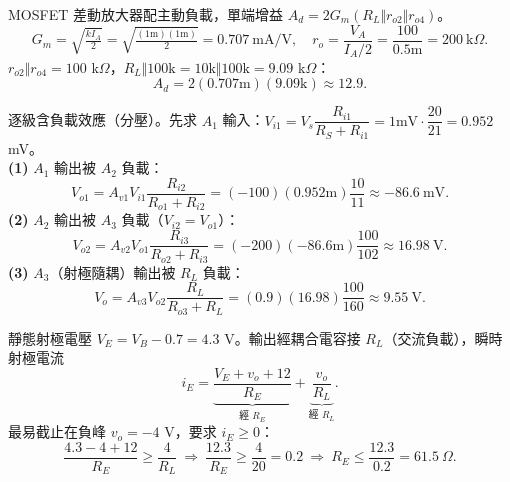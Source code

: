\documentclass[12pt]{article}
\begin{document}
\sol MOSFET 差動放大器配主動負載，單端增益 $A_d=2G_m(R_L\Vert r_{o2}\Vert r_{o4})$。
\[ G_m=\sqrt{\tfrac{kI_A}{2}}=\sqrt{\tfrac{(1\text{m})(1\text{m})}{2}}=0.707\ \text{mA/V},\quad
   r_o=\frac{V_A}{I_A/2}=\frac{100}{0.5\text{m}}=200\ \text{k}\Omega. \]
$r_{o2}\Vert r_{o4}=100$ k$\Omega$，$R_L\Vert100\text{k}=10\text{k}\Vert100\text{k}=9.09$ k$\Omega$：
\[ A_d=2(0.707\text{m})(9.09\text{k})\approx12.9. \]

\begin{minipage}{0.60\linewidth}
\end{minipage}\hfill
\begin{minipage}{0.37\linewidth}
\end{minipage}

\sol 逐級含負載效應（分壓）。先求 $A_1$ 輸入：$V_{i1}=V_s\dfrac{R_{i1}}{R_S+R_{i1}}=1\text{mV}\cdot\dfrac{20}{21}=0.952$ mV。\\
\textbf{(1)} $A_1$ 輸出被 $A_2$ 負載：
\[ V_{o1}=A_{v1}V_{i1}\frac{R_{i2}}{R_{o1}+R_{i2}}=(-100)(0.952\text{m})\frac{10}{11}\approx-86.6\ \text{mV}. \]
\textbf{(2)} $A_2$ 輸出被 $A_3$ 負載（$V_{i2}=V_{o1}$）：
\[ V_{o2}=A_{v2}V_{o1}\frac{R_{i3}}{R_{o2}+R_{i3}}=(-200)(-86.6\text{m})\frac{100}{102}\approx16.98\ \text{V}. \]
\textbf{(3)} $A_3$（射極隨耦）輸出被 $R_L$ 負載：
\[ V_o=A_{v3}V_{o2}\frac{R_L}{R_{o3}+R_L}=(0.9)(16.98)\frac{100}{160}\approx9.55\ \text{V}. \]

\begin{minipage}{0.60\linewidth}
\end{minipage}\hfill
\begin{minipage}{0.37\linewidth}
\end{minipage}

\sol 靜態射極電壓 $V_E=V_B-0.7=4.3$ V。輸出經耦合電容接 $R_L$（交流負載），瞬時射極電流
\[ i_E=\underbrace{\frac{V_E+v_o+12}{R_E}}_{\text{經 }R_E}+\underbrace{\frac{v_o}{R_L}}_{\text{經 }R_L}. \]
最易截止在負峰 $v_o=-4$ V，要求 $i_E\ge0$：
\[ \frac{4.3-4+12}{R_E}\ge\frac{4}{R_L}\ \Rightarrow\ \frac{12.3}{R_E}\ge\frac{4}{20}=0.2
   \ \Rightarrow\ R_E\le\frac{12.3}{0.2}=61.5\ \Omega. \]
\end{document}
